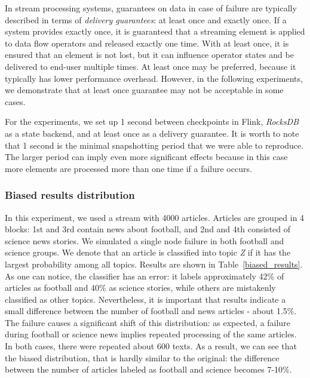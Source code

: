 In stream processing systems, guarantees on data in case of failure are typically described in terms of {\em delivery guarantees}: at least once and exactly once. If a system provides exactly once, it is guaranteed that a streaming element is applied to data flow operators and released exactly one time. With at least once, it is ensured that an element is not lost, but it can influence operator states and be delivered to end-user multiple times. At least once may be preferred, because it typically has lower performance overhead. However, in the following experiments, we demonstrate that at least once guarantee may not be acceptable in some cases. 

For the experiments, we set up 1 second between checkpoints in Flink, {\em RocksDB} as a state backend, and at least once as a delivery guarantee. It is worth to note that 1 second is the minimal snapshotting period that we were able to reproduce. The larger period can imply even more significant effects because in this case more elements are processed more than one time if a failure occurs.

\subsubsection{Biased results distribution}

In this experiment, we used a stream with 4000 articles. Articles are grouped in 4 blocks: 1st and 3rd contain news about football, and 2nd and 4th consisted of science news stories. We simulated a single node failure in both football and science groups. We denote that an article is classified into topic {\em Z} if it has the largest probability among all topics. Results are shown in Table~\ref{biased_results}. As one can notice, the classifier has an error: it labels approximately 42\% of articles as football and 40\% as science stories, while others are mistakenly classified as other topics. Nevertheless, it is important that results indicate a small difference between the number of football and news articles - about 1.5\%. The failure causes a significant shift of this distribution: as expected, a failure during football or science news implies repeated processing of the same articles. In both cases, there were repeated about 600 texts. As a result, we can see that the biased distribution, that is hardly similar to the original: the difference between the number of articles labeled as football and science becomes 7-10\%. 

